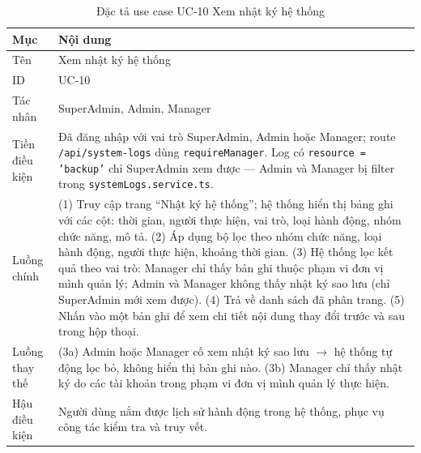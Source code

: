 \documentclass[../DoAn.tex]{subfiles}
\begin{document}
\begin{table}[H]
\centering
\caption{Đặc tả use case UC-10 Xem nhật ký hệ thống}
\label{tab:uc10}
\begin{tabular}{|>{\raggedright\arraybackslash}p{3cm}|p{11cm}|}
\hline
\textbf{Mục} & \textbf{Nội dung} \\ \hline
Tên & Xem nhật ký hệ thống \\ \hline
ID & UC-10 \\ \hline
Tác nhân & SuperAdmin, Admin, Manager \\ \hline
Tiền điều kiện & Đã đăng nhập với vai trò SuperAdmin, Admin hoặc Manager; route \texttt{/api/system-logs} dùng \texttt{requireManager}. Log có \texttt{resource = 'backup'} chỉ SuperAdmin xem được --- Admin và Manager bị filter trong \texttt{systemLogs.service.ts}. \\ \hline
Luồng chính &
(1) Truy cập trang ``Nhật ký hệ thống''; hệ thống hiển thị bảng ghi với các cột: thời gian, người thực hiện, vai trò, loại hành động, nhóm chức năng, mô tả. (2) Áp dụng bộ lọc theo nhóm chức năng, loại hành động, người thực hiện, khoảng thời gian. (3) Hệ thống lọc kết quả theo vai trò: Manager chỉ thấy bản ghi thuộc phạm vi đơn vị mình quản lý; Admin và Manager không thấy nhật ký sao lưu (chỉ SuperAdmin mới xem được). (4) Trả về danh sách đã phân trang. (5) Nhấn vào một bản ghi để xem chi tiết nội dung thay đổi trước và sau trong hộp thoại. \\ \hline
Luồng thay thế &
(3a) Admin hoặc Manager cố xem nhật ký sao lưu $\rightarrow$ hệ thống tự động lọc bỏ, không hiển thị bản ghi nào. (3b) Manager chỉ thấy nhật ký do các tài khoản trong phạm vi đơn vị mình quản lý thực hiện. \\ \hline
Hậu điều kiện & Người dùng nắm được lịch sử hành động trong hệ thống, phục vụ công tác kiểm tra và truy vết. \\ \hline
\end{tabular}
\end{table}
\end{document}
